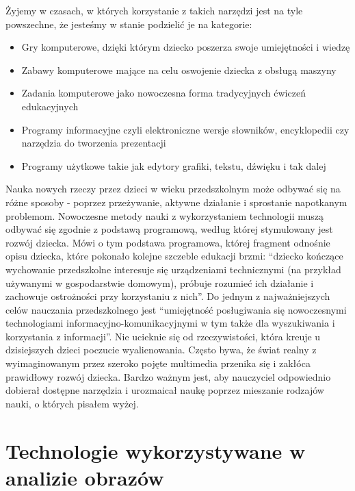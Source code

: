 \documentclass{article}
\begin{document}
	\par
	Żyjemy w czasach, w których korzystanie z takich narzędzi jest na tyle powszechne, że jesteśmy w stanie podzielić je na kategorie\cite{ref8}:
	\newline
	\begin{itemize}
		\item Gry komputerowe, dzięki którym dziecko poszerza swoje umiejętności i wiedzę
		\item Zabawy komputerowe mające na celu oswojenie dziecka z obsługą maszyny
		\item Zadania komputerowe jako nowoczesna forma tradycyjnych ćwiczeń edukacyjnych
		\item Programy informacyjne czyli elektroniczne wersje słowników, encyklopedii czy narzędzia do tworzenia prezentacji
		\item Programy użytkowe takie jak edytory grafiki, tekstu, dźwięku i tak dalej
	\end{itemize}
	\par
	Nauka nowych rzeczy przez dzieci w wieku przedszkolnym może odbywać się na różne sposoby - poprzez przeżywanie, aktywne działanie i sprostanie napotkanym problemom. Nowoczesne metody nauki z wykorzystaniem technologii muszą odbywać się zgodnie z podstawą programową, według której stymulowany jest rozwój dziecka. Mówi o tym podstawa programowa, której fragment odnośnie opisu dziecka, które pokonało kolejne szczeble edukacji brzmi: “dziecko kończące wychowanie przedszkolne interesuje się urządzeniami technicznymi (na przykład używanymi w gospodarstwie domowym), próbuje rozumieć ich działanie i zachowuje ostrożności przy korzystaniu z nich”\cite{ref9}. Do jednym z najważniejszych celów nauczania przedszkolnego jest “umiejętność posługiwania się nowoczesnymi technologiami informacyjno-komunikacyjnymi w tym także dla wyszukiwania i korzystania z informacji”. Nie ucieknie się od rzeczywistości, która kreuje u dzisiejszych dzieci poczucie wyalienowania. Często bywa, że świat realny z wyimaginowanym przez szeroko pojęte multimedia przenika się i zakłóca prawidłowy rozwój dziecka. Bardzo ważnym jest, aby nauczyciel odpowiednio dobierał dostępne narzędzia i urozmaicał naukę poprzez mieszanie rodzajów nauki, o których pisałem wyżej.
	
	\section{Technologie wykorzystywane w analizie obrazów}
\end{document}

